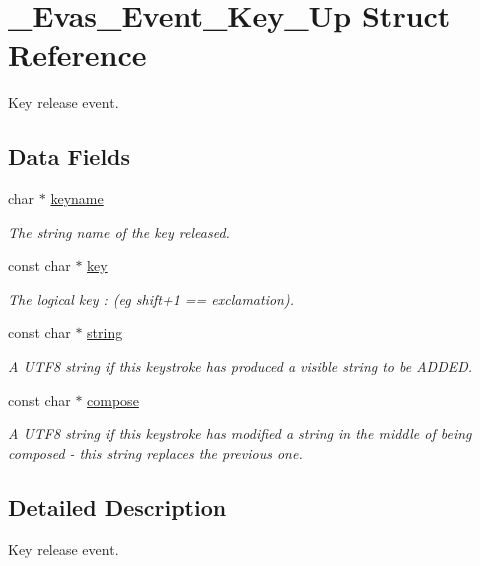 \section{\_\-Evas\_\-Event\_\-Key\_\-Up Struct Reference}
\label{struct__Evas__Event__Key__Up}


Key release event.  


\subsection*{Data Fields}
\begin{DoxyCompactItemize}
\item 
char $\ast$ \hyperlink{struct__Evas__Event__Key__Up_a03b32c8ba37a03fbd3ea7cd63e5f47be}{keyname}\label{struct__Evas__Event__Key__Up_a03b32c8ba37a03fbd3ea7cd63e5f47be}

\begin{DoxyCompactList}\small\item\em The string name of the key released. \item\end{DoxyCompactList}\item 
const char $\ast$ \hyperlink{struct__Evas__Event__Key__Up_a865118cf93e4454ac101d663b8027b41}{key}\label{struct__Evas__Event__Key__Up_a865118cf93e4454ac101d663b8027b41}

\begin{DoxyCompactList}\small\item\em The logical key : (eg shift+1 == exclamation). \item\end{DoxyCompactList}\item 
const char $\ast$ \hyperlink{struct__Evas__Event__Key__Up_aadff1de218baec7322b0ed0f6cf6d662}{string}\label{struct__Evas__Event__Key__Up_aadff1de218baec7322b0ed0f6cf6d662}

\begin{DoxyCompactList}\small\item\em A UTF8 string if this keystroke has produced a visible string to be ADDED. \item\end{DoxyCompactList}\item 
const char $\ast$ \hyperlink{struct__Evas__Event__Key__Up_ac0d6a67e53331d863d141475b1b905fb}{compose}\label{struct__Evas__Event__Key__Up_ac0d6a67e53331d863d141475b1b905fb}

\begin{DoxyCompactList}\small\item\em A UTF8 string if this keystroke has modified a string in the middle of being composed -\/ this string replaces the previous one. \item\end{DoxyCompactList}\end{DoxyCompactItemize}


\subsection{Detailed Description}
Key release event. 